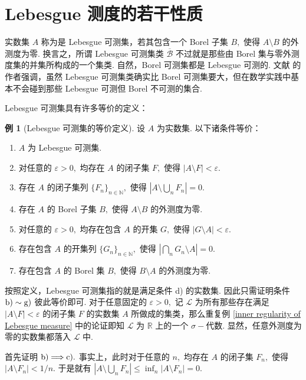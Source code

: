 \documentclass[12pt, a4paper, oneside]{book}
\numberwithin{figure}{section}
\theoremstyle{definition}
\newtheorem{example}[theorem]{例}
\begin{document}
\section{Lebesgue 测度的若干性质}
实数集 $A$ 称为是 Lebesgue 可测集，若其包含一个 Borel 子集 $B,$ 使得 $A\setminus B$ 的外测度为零. 换言之，所谓 Lebesgue 可测集类 $\overline{\mathcal B}$ 不过就是那些由 Borel 集与零外测度集的并集所构成的一个集类. 自然，Borel 可测集都是 Lebesgue 可测的. 
文献 \cite{Axler_2020} 的作者强调，虽然 Lebesgue 可测集类确实比 Borel 可测集要大，但在数学实践中基本不会碰到那些 Lebesgue 可测但 Borel 不可测的集合.

Lebesgue 可测集具有许多等价的定义：
\begin{example}[Lebesgue 可测集的等价定义]\label{ex:equivalent definitions of Lebesgue measurable sets}
    设 $A$ 为实数集. 以下诸条件等价：
    \begin{enumerate}[label=\alph*)]
        \item $A$ 为 Lebesgue 可测集.
        \item 对任意的 $\varepsilon>0,$ 均存在 $A$ 的闭子集 $F,$ 使得 $|A\setminus F|<\varepsilon.$
        \item 存在 $A$ 的闭子集列 $\{F_n\}_{n\in\mathbb N},$ 使得 $|A\setminus\bigcup_n F_n|=0.$ 
        \item 存在 $A$ 的 Borel 子集 $B,$ 使得 $A\setminus B$ 的外测度为零.
        \item 对任意的 $\varepsilon>0,$ 均存在包含 $A$ 的开集 $G,$ 使得 $|G\setminus A|<\varepsilon.$
        \item 存在包含 $A$ 的开集列 $\{G_n\}_{n\in\mathbb N},$ 使得 $|\bigcap_n G_n\setminus A|=0.$ 
        \item 存在包含 $A$ 的 Borel 集 $B,$ 使得 $B\setminus A$ 的外测度为零.
    \end{enumerate}
\end{example}

按照定义，Lebesgue 可测集指的就是满足条件 d) 的实数集. 因此只需证明条件 $\rm b)\sim g)$ 彼此等价即可. 对于任意固定的 $\varepsilon>0,$ 记 $\mathcal L$ 为所有那些存在满足 $|A\setminus F|<\varepsilon$ 的闭子集 $F$ 的实数集 $A$ 所做成的集类，那么重复例 \ref{inner regularity of Lebesgue measure} 中的论证即知 $\mathcal L$ 为 $\mathbb R$ 上的一个
$\sigma-$代数. 显然，任意外测度为零的实数集都落入 $\mathcal L$ 中.

首先证明 $\rm b)\Longrightarrow c).$ 事实上，此时对于任意的 $n,$ 均存在 $A$ 的闭子集 $F_n,$ 使得 $|A\setminus F_n|<1/n.$ 于是就有 
$|A\setminus\bigcup_n F_n|\leq \inf_n |A\setminus F_n|=0.$
\end{document}
